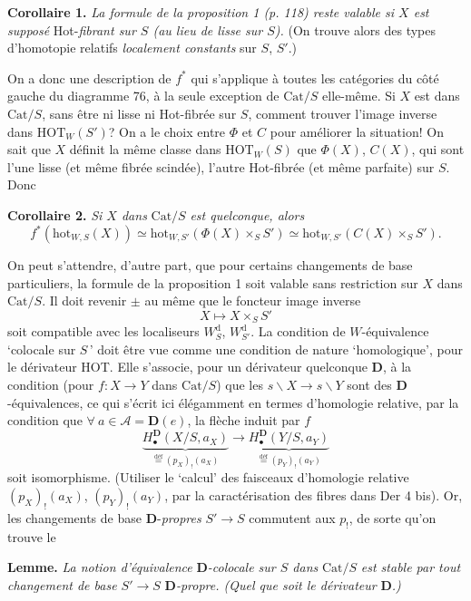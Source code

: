 \documentclass[11pt]{article}
\newcommand{\printedpage}[1]{\marginpar{\footnotesize p.~#1}}
\newcommand{\msp}[1]{\marginpar{\footnotesize [#1]}}
\newcommand{\HOT}{\mathrm{HOT}}
\newcommand{\Cat}{\mathrm{Cat}}
\newcommand{\hot}{\mathrm{hot}}
\begin{document}
\textbf{Corollaire 1.} \textit{La formule de la proposition 1 (p. 118) reste valable si $X$ est supposé} Hot-\textit{fibrant sur $S$ (au lieu de lisse sur $S$).} (On trouve alors des types d'homotopie relatifs \textit{localement constants} sur $S$, $S'$.)

On a donc une description de $f^*$ qui s'applique à toutes les catégories du côté gauche
\msp{page 120}
du diagramme 76, à la seule exception de $\Cat/S$ elle-même. Si $X$ est dans $\Cat/S$, sans être ni lisse ni Hot-fibrée sur $S$, comment trouver l'image inverse dans $\HOT_W(S')$? On a le choix entre $\Phi$ et $C$ pour améliorer la situation! On sait que $X$ définit la même classe dans $\HOT_W(S)$ que $\Phi(X)$, $C(X)$, qui sont l'une lisse (et même fibrée scindée), l'autre Hot-fibrée (et même parfaite) sur $S$. Donc

\textbf{Corollaire 2.} \textit{Si $X$ dans} $\Cat/S$ \textit{est quelconque, alors}
\[
f^*(\hot_{W,S}(X)) \simeq \hot_{W,S'}(\Phi(X) \times_S S') \simeq \hot_{W,S'}(C(X) \times_S S').
\]

\bigskip

On peut s'attendre, d'autre part, que pour certains changements de base particuliers, la formule de la proposition 1 soit valable sans restriction sur $X$ dans $\Cat/S$. Il doit revenir $\pm$ au même que le foncteur image inverse
\[
X \longmapsto X \times_S S'
\]
soit compatible avec les localiseurs $W_S^{\mathrm{d}}$, $W_{S'}^{\mathrm{d}}$. La condition de $W$-équivalence `colocale sur $S$\,' doit être vue comme une condition de nature `homologique', pour le dérivateur HOT. Elle s'associe, pour un dérivateur quelconque $\mathbf{D}$, à la condition (pour $f : X \longrightarrow Y$ dans $\Cat/S$) que les $s\backslash X \longrightarrow s\backslash Y$ sont des $\mathbf{D}$-équivalences,
\printedpage{75}
\msp{page 121}
ce qui s'écrit ici élégamment en termes d'homologie relative, par la condition que $\forall\ a \in \mathcal{A} = \mathbf{D}(e)$, la flèche induit par $f$ %
\[
\underbrace{H_\bullet^{\mathbf{D}}(X/S, a_X)}_{\overset{\text{déf}}{=}(p_X)_!(a_X)} \longrightarrow \underbrace{H_\bullet^{\mathbf{D}}(Y/S, a_Y)}_{\overset{\text{déf}}{=}(p_Y)_!(a_Y)}
\]
soit isomorphisme. (Utiliser le `calcul' des faisceaux d'homologie relative $(p_X)_!(a_X)$, $(p_Y)_!(a_Y)$, par la caractérisation des fibres dans Der 4 bis). Or, les changements de base $\mathbf{D}$-\textit{propres} $S' \longrightarrow S$ commutent aux $p_!$, de sorte qu'on trouve le

\textbf{Lemme.} \textit{La notion d'équivalence} $\mathbf{D}$\textit{-colocale sur $S$ dans} $\Cat/S$ \textit{est stable par tout changement de base $S' \longrightarrow S$} $\mathbf{D}$\textit{-propre. (Quel que soit le dérivateur} $\mathbf{D}$\textit{.)}
\end{document}
